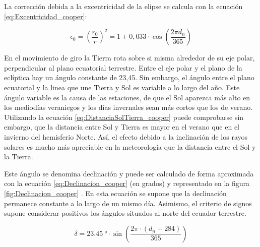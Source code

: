 La corrección debida a la excentricidad de la elipse se calcula con
la ecuación \ref{eq:Excentricidad_cooper}:

\begin{equation}
\epsilon_{0}=(\frac{r_{0}}{r})^2=1+0,033\cdot\cos(\frac{2\pi
  d_{n}}{365})
\label{eq:Excentricidad_cooper}
\end{equation}

En el movimiento de giro la Tierra rota sobre si misma alrededor de
su eje polar, perpendicular al plano ecuatorial terrestre. Entre el
eje polar y el plano de la eclíptica hay un ángulo constante de 23,45\textdegree{}.
Sin embargo, el ángulo entre el plano ecuatorial y la linea que une
Tierra y Sol es variable a lo largo del año. Este ángulo variable
es la causa de las estaciones, de que el Sol aparezca más alto en
los mediodías veraniegos y los días invernales sean más cortos que
los de verano. Utilizando la ecuación \ref{eq:DistanciaSolTierra_cooper}
puede comprobarse sin embargo, que la distancia entre Sol y Tierra
es mayor en el verano que en el invierno del hemisferio Norte. Así,
el efecto debido a la inclinación de los rayos solares es mucho más
apreciable en la meteorología que la distancia entre el Sol y la Tierra. 

Este ángulo se denomina declinación y puede ser calculado de forma
aproximada con la ecuación \ref{eq:Declinacion_cooper} (en grados) y representado en
la figura \ref{fig:Declinacion_cooper} \cite{Cooper1969}. En esta ecuación se supone
que la declinación permanece constante a lo largo de un mismo día.
Asimismo, el criterio de signos supone considerar
positivos los ángulos situados al norte del ecuador terrestre.

\begin{equation}
\delta=\SI{23.45}{\degree}\cdot\sin\left(\frac{2\pi\cdot\left(d_{n}+284\right)}{365}\right)\label{eq:Declinacion_cooper}\end{equation}


